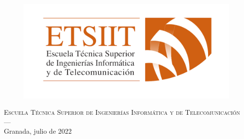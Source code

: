 \begin{titlepage}
	
	
\vspace{1cm}
\begin{figure}[h!]
	\centering
	\includegraphics[width=0.3\linewidth]{figures/logo2}
	\label{fig:logo2}
\end{figure}


\noindent\hspace*{\centeroffset}\begin{minipage}{\textwidth}
	\centering
\textsc{Escuela Técnica Superior de Ingenierías Informática y de Telecomunicación}\\
\textsc{---}\\
Granada, julio de 2022
\end{minipage}


\end{titlepage}